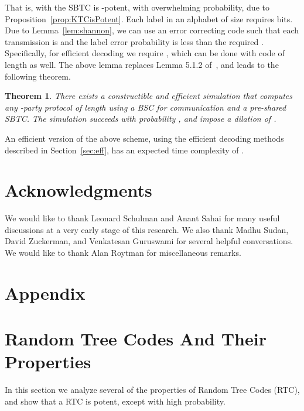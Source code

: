 \documentclass[ letterpaper, 11pt]{article}
\newtheorem{theorem}{Theorem}[section]
\newcommand{\potent}{potent\xspace}
\newcommand{\RTBC}{\textsf{RTC}\xspace}
\newcommand{\KTC}{\textsf{SBTC}\xspace}
\begin{document}
That is, with  the \KTC is -\potent, with
overwhelming probability, due to Proposition~\ref{prop:KTCisPotent}.
Each label in an alphabet of size  requires  bits.
Due to Lemma~\ref{lem:shannon}, we can use an error correcting code
such that each transmission is  and the label error probability is
less than the required . Specifically,
for efficient decoding we require ,
which can be done with code of length
 as well.
The above lemma replaces
Lemma 5.1.2 of~\cite{RS94}, and
leads to  the following theorem.
\begin{theorem}\label{thm:multiparty}
There exists a constructible and efficient  simulation
that computes any -party protocol  of length 
using a BSC for communication and a pre-shared \KTC.
The simulation succeeds with probability ,
and impose a dilation of .
\end{theorem}
\noindent An efficient version of the above scheme,
using the efficient decoding methods described in Section~\ref{sec:eff},
has an expected time complexity of .


\section*{Acknowledgments}
We would like to thank Leonard Schulman and Anant Sahai for many useful discussions at a very early stage of this research. We also thank Madhu Sudan, David Zuckerman, and Venkatesan Guruswami for several helpful conversations.  We would like to thank Alan Roytman for miscellaneous remarks.
















\appendix
\section*{Appendix}


\section{Random Tree Codes And Their Properties}\label{app:RTBC}
In this section we analyze several of the properties of Random Tree Codes (\RTBC), and show that
a \RTBC is potent, except with high probability.
\end{document}
